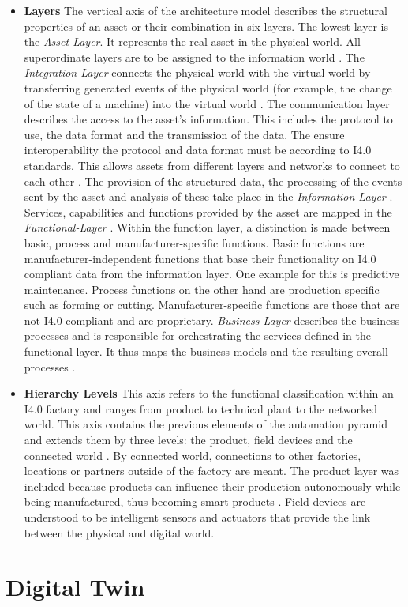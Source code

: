 \begin{itemize}
    \item[] \textbf{Layers} The vertical axis of the architecture model describes the structural properties of an asset or their combination in six layers. The lowest layer is the \textit{Asset-Layer}. It represents the real asset in the physical world. All superordinate layers are to be assigned to the information world \cite[p. 46]{Heidel2017ReferenzarchitekturmodellIndustrie4.0Komponente}. The \textit{Integration-Layer} connects the physical world with the virtual world by transferring generated events of the physical world (for example, the change of the state of a machine) into the virtual world \cite[p. 47]{Heidel2017ReferenzarchitekturmodellIndustrie4.0Komponente}. The communication layer describes the access to the asset's information. This includes the protocol to use, the data format and the transmission of the data. The ensure interoperability the protocol and data format must be according to \ac{I4.0} standards. This allows assets from different layers and networks to connect to each other \cite[p. 47,48]{Heidel2017ReferenzarchitekturmodellIndustrie4.0Komponente}. The provision of the structured data, the processing of the events sent by the asset and analysis of these take place in the \textit{Information-Layer} \cite[p. 51]{Heidel2017ReferenzarchitekturmodellIndustrie4.0Komponente}. Services, capabilities and functions provided by the asset are mapped in the \textit{Functional-Layer} \cite[p. 51]{Heidel2017ReferenzarchitekturmodellIndustrie4.0Komponente}. Within the function layer, a distinction is made between basic, process and manufacturer-specific functions. Basic functions are manufacturer-independent functions that base their functionality on \ac{I4.0} compliant data from the information layer. One example for this is predictive maintenance. Process functions on the other hand are production specific such as forming or cutting. Manufacturer-specific functions are those that are not \ac{I4.0} compliant and are proprietary. \textit{Business-Layer} describes the business processes and is responsible for orchestrating the services defined in the functional layer. It thus maps the business models and the resulting overall processes \cite[p. 53]{Heidel2017ReferenzarchitekturmodellIndustrie4.0Komponente}.
    \item[] \textbf{Hierarchy Levels} This axis refers to the functional classification within an \ac{I4.0} factory and ranges from product to technical plant to the networked world. This axis contains the previous elements of the automation pyramid and extends them by three levels: the product, field devices and the connected world \cite[p. 44]{Heidel2017ReferenzarchitekturmodellIndustrie4.0Komponente}. By connected world, connections to other factories, locations or partners outside of the factory are meant. The product layer was included because products can influence their production autonomously while being manufactured, thus becoming smart products \cite[p. 21]{Acatech2013Recommendations4.0}. Field devices are understood to be intelligent sensors and actuators that provide the link between the physical and digital world.  
\end{itemize}

\section{Digital Twin}



